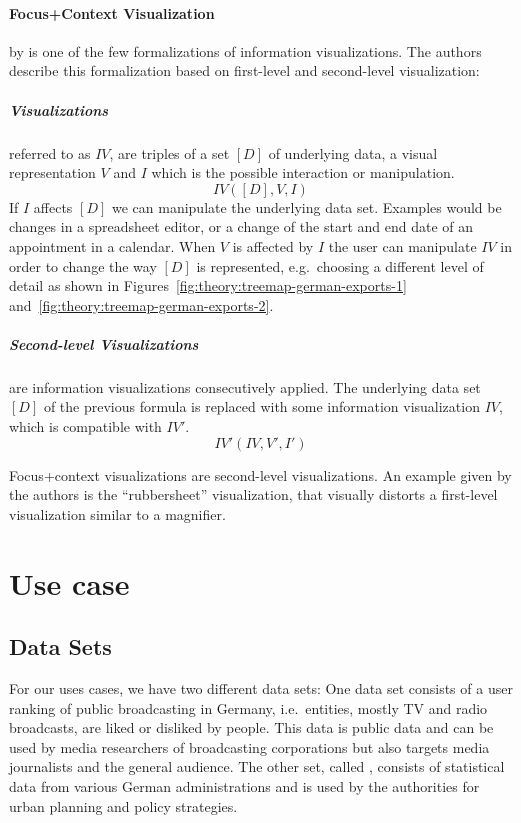 \paragraph{Focus+Context Visualization} by \textcite{Bjork1999} is one of the few formalizations of information visualizations.
The authors describe this formalization based on first-level and second-level visualization:
\subparagraph{Visualizations} referred to as $IV$, are triples of a set $[D]$ of underlying data, a visual representation $V$ and $I$ which is the possible interaction or manipulation.
\begin{equation}
  IV([D], V, I)
\end{equation}
If $I$ affects $[D]$ we can manipulate the underlying data set.
Examples would be changes in a spreadsheet editor, or a change of the start and end date of an appointment in a calendar.
When $V$ is affected by $I$ the user can manipulate $IV$ in order to change the way $[D]$ is represented, e.g.\ choosing a different level of detail as shown in Figures~\ref{fig:theory:treemap-german-exports-1} and~\ref{fig:theory:treemap-german-exports-2}.

\subparagraph{Second-level Visualizations} are information visualizations consecutively applied.
The underlying data set $[D]$ of the previous formula is replaced with some information visualization $IV$, which is compatible with $IV'$.
\begin{equation}
  IV'(IV, V', I')
\end{equation}


Focus+context visualizations are second-level visualizations.
An example given by the authors is the  ``rubbersheet'' visualization, that visually distorts a first-level visualization similar to a magnifier.




\clearpage
\section{Use case}\label{sec:use-case}

\subsection{Data Sets}
For our uses cases, we have two different data sets:
One data set consists of a user ranking of public broadcasting in Germany, i.e.\ entities, mostly TV and radio broadcasts, are liked or disliked by people.
This data is public data and can be used by media researchers of broadcasting corporations but also targets media journalists and the general audience.
The other set, called \riso{}, consists of statistical data from various German administrations and is used by the authorities for urban planning and policy strategies.


